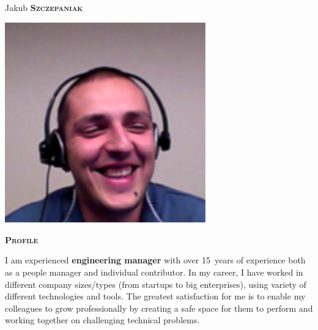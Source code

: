 \documentclass[11pt, a4paper]{article}
\newcommand{\headleft}[1]{\vspace*{3ex}\textsc{\textbf{#1}}\par%
    \vspace*{-1.5ex}\hrulefill\par\vspace*{0.7ex}}
\begin{document}
\setlength{\topskip}{0pt}
\setlength{\parindent}{0pt}
\setlength{\parskip}{0pt}
\setlength{\fboxsep}{0pt}
\pagestyle{empty}
\raggedbottom

\begin{minipage}[t]{0.33\textwidth} %
\colorbox{cvblue}{\begin{minipage}[t][5mm][t]{\textwidth}\null\hfill\null\end{minipage}}

\vspace{-.2ex} %
\colorbox{cvblue!90}{\color{white}  %
\textwidth\relax%
\begin{minipage}[t][293mm][t]{0.82\textwidth}
\raggedright
\vspace*{2.5ex}

\Large Jakub \textbf{\textsc{Szczepaniak}} \normalsize 

\null\hfill\includegraphics[width=0.65\textwidth]{photo.png}\hfill\null

\vspace*{0.5ex} %

\headleft{Profile}
I am experienced \textbf{engineering manager} with over 15~years of experience both as a people manager and individual contributor.
In my career, I have worked in different company sizes/types (from startups to big enterprises), using variety of different technologies and tools.
The greatest satisfaction for me is to enable my colleagues to grow professionally by creating a safe space for them to perform and working together on challenging technical problems.


\end{minipage}}
\end{minipage}
\end{document}
